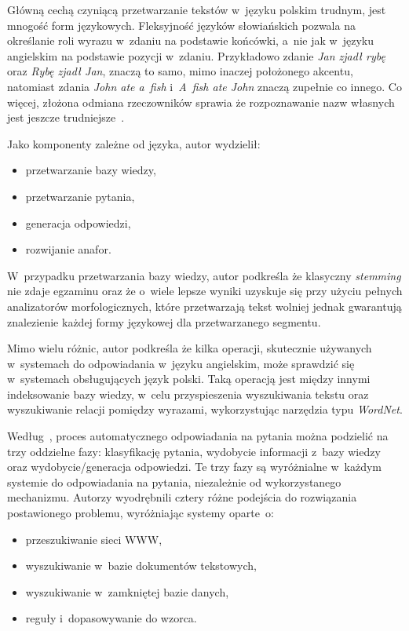 Główną cechą czyniącą przetwarzanie tekstów w~języku polskim trudnym, jest mnogość form językowych. Fleksyjność języków słowiańskich pozwala na określanie roli wyrazu w~zdaniu na podstawie końcówki, a~nie jak w~języku angielskim na podstawie pozycji w~zdaniu. Przykładowo zdanie \emph{Jan zjadł rybę} oraz \emph{Rybę zjadł Jan}, znaczą to samo, mimo inaczej położonego akcentu, natomiast zdania \emph{John ate a~fish} i~\emph{A~fish ate John} znaczą zupełnie co innego. Co więcej, złożona odmiana rzeczowników sprawia że rozpoznawanie nazw własnych jest jeszcze trudniejsze~\cite{przybyla2012issues}.

Jako komponenty zależne od języka, autor wydzielił:
\begin{itemize}
	\item przetwarzanie bazy wiedzy,
	\item przetwarzanie pytania,
	\item generacja odpowiedzi,
	\item rozwijanie anafor.
\end{itemize}

W~przypadku przetwarzania bazy wiedzy, autor podkreśla że klasyczny \emph{stemming} nie zdaje egzaminu oraz że o~wiele lepsze wyniki uzyskuje się przy użyciu pełnych analizatorów morfologicznych, które przetwarzają tekst wolniej jednak gwarantują znalezienie każdej formy językowej dla przetwarzanego segmentu.

Mimo wielu różnic, autor podkreśla że kilka operacji, skutecznie używanych w~systemach do odpowiadania w~języku angielskim, może sprawdzić się w~systemach obsługujących język polski. Taką operacją jest między innymi indeksowanie bazy wiedzy, w~celu przyspieszenia wyszukiwania tekstu oraz wyszukiwanie relacji pomiędzy wyrazami, wykorzystując narzędzia typu \emph{WordNet}.

Według~\cite{gupta2012survey}, proces automatycznego odpowiadania na pytania można podzielić na trzy oddzielne fazy: klasyfikację pytania, wydobycie informacji z~bazy wiedzy oraz wydobycie/generacja odpowiedzi. Te trzy fazy są wyróżnialne w~każdym systemie do odpowiadania na pytania, niezależnie od wykorzystanego mechanizmu. Autorzy wyodrębnili cztery różne podejścia do rozwiązania postawionego problemu, wyróżniając systemy oparte~o:
\begin{itemize}
	\item przeszukiwanie sieci WWW,
	\item wyszukiwanie w~bazie dokumentów tekstowych,
	\item wyszukiwanie w~zamkniętej bazie danych,
	\item reguły i~dopasowywanie do wzorca.
\end{itemize}

